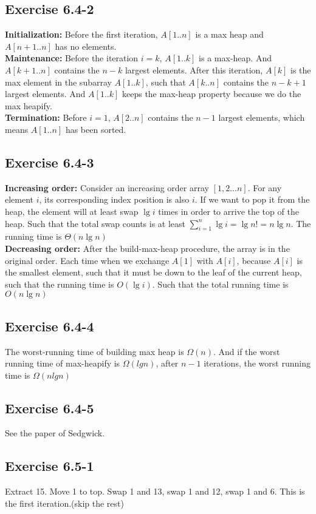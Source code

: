 \documentclass[12pt]{article}
\theoremstyle{definition}
\theoremstyle{remark}
\begin{document}
\subsection*{Exercise 6.4-2}
\textbf{Initialization:} Before the first iteration, $A[1..n]$ is a max heap and $A[n+1..n]$ has no elements.\\
\textbf{Maintenance:} Before the iteration $i=k$, $A[1..k]$ is a max-heap. And $A[k+1..n]$ contains the $n-k$ largest elements. After this iteration, $A[k]$ is the max element in the subarray $A[1..k]$, such that $A[k..n]$ contains the $n-k+1$ largest elements. And $A[1..k]$ keeps the max-heap property because we do the max heapify.\\
\textbf{Termination:} Before $i=1$, $A[2..n]$ contains the $n-1$ largest elements, which means $A[1..n]$ has been sorted.
\subsection*{Exercise 6.4-3}
\textbf{Increasing order:} Consider an increasing order array $[1,2...n]$. For any element $i$, its corresponding index position is also $i$. If we want to pop it from the heap, the element will at least swap $\lg{i}$ times in order to arrive the top of the heap. Such that the total swap counts is at least $\sum_{i=1}^n\lg{i}=\lg{n!}=n\lg{n}$. The running time is $\Theta(n\lg{n})$\\
\textbf{Decreasing order:} After the build-max-heap procedure, the array is in the original order. Each time when we exchange $A[1]$ with $A[i]$, because $A[i]$ is the smallest element, such that it must be down to the leaf of the current heap, such that the running time is $O(\lg{i})$. Such that the total running time is $O(n\lg{n})$
\subsection*{Exercise 6.4-4}
The worst-running time of building max heap is $\Omega(n)$. And if the worst running time of max-heapify is $\Omega(lgn)$, after $n-1$ iterations, the worst running time is $\Omega(nlgn)$
\subsection*{Exercise 6.4-5}
See the paper of Sedgwick.
\subsection*{Exercise 6.5-1}
Extract 15. Move 1 to top. Swap 1 and 13, swap 1 and 12, swap 1 and 6. This is the first iteration.(skip the rest)
\end{document}
